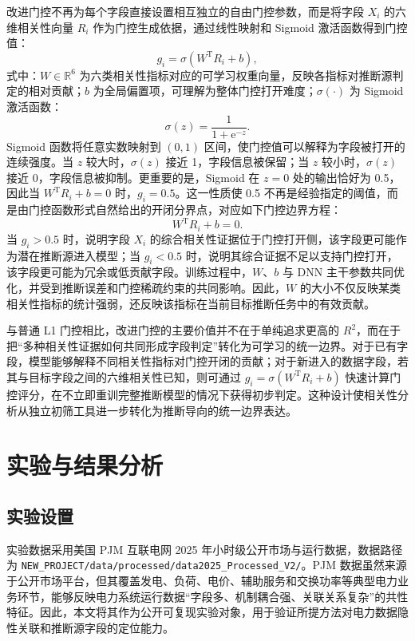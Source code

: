 \documentclass[UTF8,zihao=5,twoside]{ctexart}
\numberwithin{equation}{section}
\newcommand{\code}[1]{\texttt{#1}}
\begin{document}
改进门控不再为每个字段直接设置相互独立的自由门控参数，而是将字段 $X_i$ 的六维相关性向量 $R_i$ 作为门控生成依据，通过线性映射和 Sigmoid 激活函数得到门控值：
\begin{equation}
g_i=\sigma(W^{\mathrm{T}}R_i+b),
\end{equation}
式中：$W\in\mathbb{R}^{6}$ 为六类相关性指标对应的可学习权重向量，反映各指标对推断源判定的相对贡献；$b$ 为全局偏置项，可理解为整体门控打开难度；$\sigma(\cdot)$ 为 Sigmoid 激活函数：
\begin{equation}
\sigma(z)=\frac{1}{1+\mathrm{e}^{-z}}.
\end{equation}
Sigmoid 函数将任意实数映射到 $(0,1)$ 区间，使门控值可以解释为字段被打开的连续强度。当 $z$ 较大时，$\sigma(z)$ 接近 1，字段信息被保留；当 $z$ 较小时，$\sigma(z)$ 接近 0，字段信息被抑制。更重要的是，Sigmoid 在 $z=0$ 处的输出恰好为 0.5，因此当 $W^{\mathrm{T}}R_i+b=0$ 时，$g_i=0.5$。这一性质使 0.5 不再是经验指定的阈值，而是由门控函数形式自然给出的开闭分界点，对应如下门控边界方程：
\begin{equation}
W^{\mathrm{T}}R_i+b=0.
\end{equation}
当 $g_i>0.5$ 时，说明字段 $X_i$ 的综合相关性证据位于门控打开侧，该字段更可能作为潜在推断源进入模型；当 $g_i<0.5$ 时，说明其综合证据不足以支持门控打开，该字段更可能为冗余或低贡献字段。训练过程中，$W$、$b$ 与 DNN 主干参数共同优化，并受到推断误差和门控稀疏约束的共同影响。因此，$W$ 的大小不仅反映某类相关性指标的统计强弱，还反映该指标在当前目标推断任务中的有效贡献。

与普通 L1 门控相比，改进门控的主要价值并不在于单纯追求更高的 $R^2$，而在于把“多种相关性证据如何共同形成字段判定”转化为可学习的统一边界。对于已有字段，模型能够解释不同相关性指标对门控开闭的贡献；对于新进入的数据字段，若其与目标字段之间的六维相关性已知，则可通过 $g_i=\sigma(W^{\mathrm{T}}R_i+b)$ 快速计算门控评分，在不立即重训完整推断模型的情况下获得初步判定。这种设计使相关性分析从独立初筛工具进一步转化为推断导向的统一边界表达。

\section{实验与结果分析}
\subsection{实验设置}
实验数据采用美国 PJM 互联电网 2025 年小时级公开市场与运行数据，数据路径为 \code{NEW\_PROJECT/data/processed/data2025\_Processed\_V2/}。PJM 数据虽然来源于公开市场平台，但其覆盖发电、负荷、电价、辅助服务和交换功率等典型电力业务环节，能够反映电力系统运行数据“字段多、机制耦合强、关联关系复杂”的共性特征。因此，本文将其作为公开可复现实验对象，用于验证所提方法对电力数据隐性关联和推断源字段的定位能力。
\end{document}
